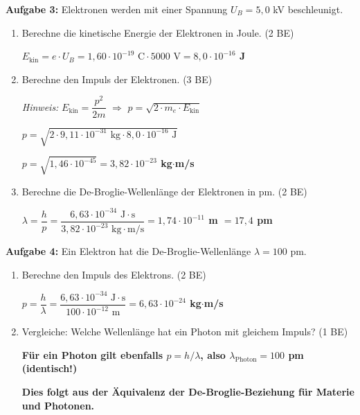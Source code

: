 \documentclass[11pt,a4paper]{article}
\newcommand{\lsg}[1]{\textcolor{loesung}{\textbf{#1}}}
\begin{document}
\vspace{0.3em}

\textbf{Aufgabe 3:} Elektronen werden mit einer Spannung $U_B = 5{,}0$ kV beschleunigt.

\begin{enumerate}[label=\alph*)]
\item Berechne die kinetische Energie der Elektronen in Joule. \hfill (2 BE)

\lsg{$E_{\text{kin}} = e \cdot U_B = 1{,}60 \cdot 10^{-19} \text{ C} \cdot 5000 \text{ V} = 8{,}0 \cdot 10^{-16}$ J}

\vspace{0.3em}

\item Berechne den Impuls der Elektronen. \hfill (3 BE)

\textit{Hinweis:} $E_{\text{kin}} = \dfrac{p^2}{2m}$ $\Rightarrow$ $p = \sqrt{2 \cdot m_e \cdot E_{\text{kin}}}$

\lsg{$p = \sqrt{2 \cdot 9{,}11 \cdot 10^{-31} \text{ kg} \cdot 8{,}0 \cdot 10^{-16} \text{ J}}$}

\lsg{$p = \sqrt{1{,}46 \cdot 10^{-45}} = 3{,}82 \cdot 10^{-23}$ kg$\cdot$m/s}

\vspace{0.3em}

\item Berechne die De-Broglie-Wellenlänge der Elektronen in pm. \hfill (2 BE)

\lsg{$\lambda = \dfrac{h}{p} = \dfrac{6{,}63 \cdot 10^{-34} \text{ J}\cdot\text{s}}{3{,}82 \cdot 10^{-23} \text{ kg}\cdot\text{m/s}} = 1{,}74 \cdot 10^{-11}$ m $= 17{,}4$ pm}

\vspace{0.3em}

\end{enumerate}

\textbf{Aufgabe 4:} Ein Elektron hat die De-Broglie-Wellenlänge $\lambda = 100$ pm.

\begin{enumerate}[label=\alph*), start=4]
\item Berechne den Impuls des Elektrons. \hfill (2 BE)

\lsg{$p = \dfrac{h}{\lambda} = \dfrac{6{,}63 \cdot 10^{-34} \text{ J}\cdot\text{s}}{100 \cdot 10^{-12} \text{ m}} = 6{,}63 \cdot 10^{-24}$ kg$\cdot$m/s}

\vspace{0.3em}

\item Vergleiche: Welche Wellenlänge hat ein Photon mit gleichem Impuls? \hfill (1 BE)

\lsg{Für ein Photon gilt ebenfalls $p = h/\lambda$, also $\lambda_{\text{Photon}} = 100$ pm (identisch!)}

\lsg{Dies folgt aus der Äquivalenz der De-Broglie-Beziehung für Materie und Photonen.}

\vspace{0.3em}

\end{enumerate}
\end{document}

